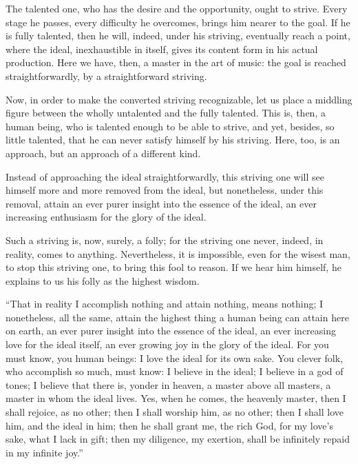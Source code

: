 \documentclass[12pt,a4paper]{book}
\begin{document}
The talented one, who has the desire and the opportunity, ought to strive. Every stage he passes, every difficulty he overcomes, brings him nearer to the goal. If he is fully talented, then he will, indeed, under his striving, eventually reach a point, where the ideal, inexhaustible in itself, gives its content form in his actual production. Here we have, then, a master in the art of music: the goal is reached straightforwardly, by a straightforward striving.

Now, in order to make the converted striving recognizable, let us place a middling figure between the wholly untalented and the
fully talented. This is, then, a human being, who is talented enough to be able to strive, and yet, besides, so little talented, that he can never satisfy himself by his striving. Here, too, is an approach, but an approach of a different kind.

Instead of approaching the ideal straightforwardly, this striving one will see himself more and more removed from the ideal, but nonetheless, under this removal, attain an ever purer insight into the essence of the ideal, an ever increasing enthusiasm for the glory of the ideal.

Such a striving is, now, surely, a folly; for the striving one never, indeed, in reality, comes to anything. Nevertheless, it is impossible, even for the wisest man, to stop this striving one, to bring this fool to reason. If we hear him himself, he explains to us his folly as the highest wisdom.

``That in reality I accomplish nothing and attain nothing, means nothing; I nonetheless, all the same, attain the highest thing a human being can attain here on earth, an ever purer insight into the essence of the ideal, an ever increasing love for the ideal itself, an ever growing joy in the glory of the ideal. For you must know, you human beings: I love the ideal for its own sake. You clever folk, who accomplish so much, must know: I believe in the ideal; I believe in a god of tones; I believe that there is, yonder in heaven, a master above all masters, a master in whom the ideal lives. Yes, when he comes, the heavenly master, then I shall rejoice, as no other; then I shall worship him, as no other; then I shall love him, and the ideal in him; then he shall grant me, the rich God, for my love's sake, what I lack in gift; then my diligence, my exertion, shall be infinitely repaid in my infinite joy.''
\end{document}
